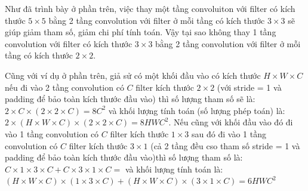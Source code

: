\documentclass[a4paper,12pt]{report}
\begin{document}
\par Như đã trình bày ở phần trên, việc thay một tầng convoluiton với filter có kích thước $5 \times 5$ bằng 2 tầng convolution với filter ở mỗi tầng có kích thước $3 \times 3$ sẽ giúp giảm tham số, giảm chi phí tính toán. Vậy tại sao không thay 1 tầng convolution với filter có kích thước $3 \times 3$ bằng 2 tầng convolution với filter ở mỗi tầng có kích thước $2 \times 2$.
\par Cũng với ví dụ ở phần trên, giả sử có một khối đầu vào có kích thước $H \times W \times C$ nếu đi vào 2 tầng convolution có $C$ filter kích thước $2 \times 2$ (với stride = 1 và padding để bảo toàn kích thước đầu vào) thì số lượng tham số sẽ là: $2 \times C \times (2 \times 2 \times C) = 8C^2$ và khối lượng tính toán (số lượng phép toán) là: $2 \times (H \times W \times C) \times (2 \times 2 \times C) = 8HWC^2$. Nếu cũng với khối đầu vào đó đi vào 1 tầng convolution có $C$ filter kích thước $1 \times 3 $ sau đó đi vào 1 tầng convolution có $C$ filter kích thước $3 \times 1$ (cả 2 tầng đều cso tham số stride = 1 và padding để bảo toàn kích thước đầu vào)thì số lượng tham số là: $C \times 1 \times 3 \times C+ C \times 3 \times 1 \times C = $ và khối lượng tính toán là: $(H \times W \times C) \times (1 \times 3 \times C) + (H \times W \times C) \times (3 \times 1 \times C) = 6HWC^2$
\end{document}
